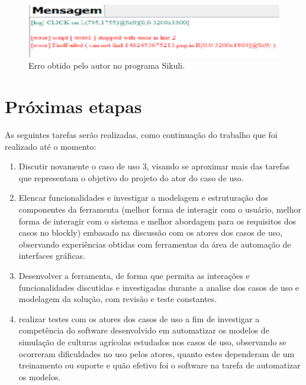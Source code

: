 \documentclass[tg]{mdtufsm}
\begin{document}
	\begin{figure}[!htb]
		{\centering
		\includegraphics[width=1.0\textwidth]{sikuli_error}
		\caption{Erro obtido pelo autor no programa Sikuli.}
		\label{fig:erroSikuli}}
	\end{figure}	
	
	
	\chapter{Próximas etapas}
	
	As seguintes tarefas serão realizadas, como continuação do trabalho que foi realizado até o momento:
	
	\begin{enumerate}
	
		\item Discutir novamente o caso de uso 3, visando se aproximar mais das tarefas que representam o objetivo do projeto do ator do caso de uso.
		
		\item Elencar funcionalidades e investigar a modelagem e estruturação dos componentes da ferramenta (melhor forma de interagir com o usuário, melhor forma de interagir com o sistema e melhor abordagem para os requisitos dos casos no blockly) embasado na discussão com os atores dos casos de uso, observando experiências obtidas com ferramentas da área de automação de interfaces gráficas.
		
		\item Desenvolver a ferramenta, de forma que permita as interações e funcionalidades discutidas e investigadas durante a analise dos casos de uso e modelagem da solução, com revisão e teste constantes.
		
		\item realizar testes com os atores dos casos de uso a fim de investigar a competência do software desenvolvido em automatizar os modelos de simulação de culturas agrícolas estudados nos casos de uso, observando se ocorreram dificuldades no uso pelos atores, quanto estes dependeram de um treinamento ou suporte e quão efetivo foi o software na tarefa de automatizar os modelos.
		 
	\end{enumerate}
	
	\setlength{\baselineskip}{\baselineskip}
	
	 
\end{document}
